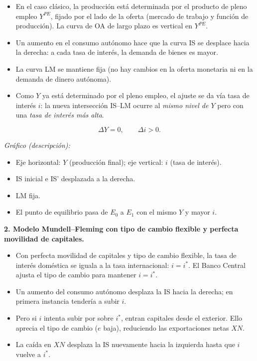 \documentclass[11pt,addpoints]{article}
\begin{document}
\begin{itemize}
  \item En el caso clásico, la producción está determinada por el producto de pleno empleo $Y^{PE}$, fijado por el lado de la oferta (mercado de trabajo y función de producción). La curva de OA de largo plazo es vertical en $Y^{PE}$.
  \item Un aumento en el consumo autónomo hace que la curva IS se desplace hacia la derecha: a cada tasa de interés, la demanda de bienes es mayor.
  \item La curva LM se mantiene fija (no hay cambios en la oferta monetaria ni en la demanda de dinero autónoma).
  \item Como $Y$ ya está determinado por el pleno empleo, el ajuste se da vía tasa de interés $i$: la nueva intersección IS--LM ocurre al \emph{mismo nivel de $Y$} pero con una \emph{tasa de interés más alta}.
\end{itemize}

\[
\Delta Y = 0, \qquad \Delta i > 0.
\]

\emph{Gráfico (descripción):}
\begin{itemize}
  \item Eje horizontal: $Y$ (producción final); eje vertical: $i$ (tasa de interés).
  \item IS inicial e IS' desplazada a la derecha.
  \item LM fija.
  \item El punto de equilibrio pasa de $E_0$ a $E_1$ con el mismo $Y$ y mayor $i$.
\end{itemize}

\medskip
\newpage
\vspace*{0.5cm}
\textbf{2. Modelo Mundell--Fleming con tipo de cambio flexible y perfecta movilidad de capitales.}

\begin{itemize}
  \item Con perfecta movilidad de capitales y tipo de cambio flexible, la tasa de interés doméstica se iguala a la tasa internacional: $i = i^*$. El Banco Central ajusta el tipo de cambio para mantener $i = i^*$.
  \item Un aumento del consumo autónomo desplaza la IS hacia la derecha; en primera instancia tendería a subir $i$.
  \item Pero si $i$ intenta subir por sobre $i^*$, entran capitales desde el exterior. Ello aprecia el tipo de cambio ($e$ baja), reduciendo las exportaciones netas $XN$.
  \item La caída en $XN$ desplaza la IS nuevamente hacia la izquierda hasta que $i$ vuelve a $i^*$.
\end{itemize}
\end{document}

